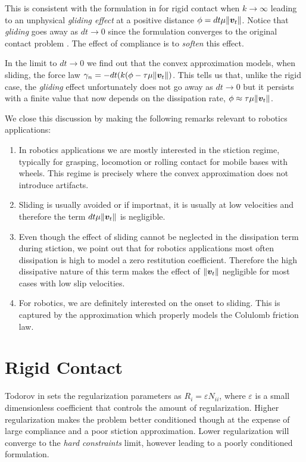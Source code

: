 This is consistent with the formulation in \cite{bib:anitescu2010} for rigid
contact when $k\rightarrow \infty$ leading to an unphysical \textit{gliding
effect} at a positive distance $\phi=dt\mu\Vert{\bm{v}}_t\Vert$. Notice that
\textit{gliding} goes away as $dt\rightarrow 0$ since the formulation converges
to the original contact problem \cite{bib:anitescu2006}. The effect of
compliance is to \textit{soften} this effect. 

In the limit to $dt\rightarrow 0$ we find out that the convex approximation
models, when sliding, the force law
$\gamma_n=-dt(k(\phi-\tau\mu\Vert{\bm{v}}_t\Vert)$. This tells us that, unlike the
rigid case, the \textit{gliding} effect unfortunately does not go away as
$dt\rightarrow 0$ but it persists with a finite value that now depends on the
dissipation rate, $\phi\approx\tau\mu\Vert{\bm{v}}_t\Vert$.

We close this discussion by making the following remarks relevant to robotics
applications:
\begin{enumerate}
	\item In robotics applications we are mostly interested in the stiction
	regime, typically for grasping, locomotion or rolling contact for mobile
	bases with wheels. This regime is precisely where the convex approximation
	does not introduce artifacts.
	\item Sliding is usually avoided or if importnat, it is usually at low
	velocities and therefore the term $dt\mu\Vert{\bm{v}}_t\Vert$ is negligible.
	\item Even though the effect of sliding cannot be neglected in the
	dissipation term during stiction, we point out that for robotics
	applications most often dissipation is high to model a zero restitution
	coefficient. Therefore the high dissipative nature of this term makes the
	effect of $\Vert{\bm{v}}_t\Vert$ negligible for most cases with low slip
	velocities.
	\item For robotics, we are definitely interested on the onset to sliding.
	This is captured by the approximation which properly models the Colulomb
	friction law.
\end{enumerate}

\section{Rigid Contact}

Todorov in \cite{bib:todorov2014} sets the regularization parameters as
$R_i=\varepsilon N_{ii}$, where $\varepsilon$ is a small dimensionless
coefficient that controls the amount of regularization. Higher regularization
makes the problem better conditioned though at the expense of large compliance
and a poor stiction approximation. Lower regularization will converge to the
\textit{hard constraints} limit, however leading to a poorly conditioned
formulation. 

